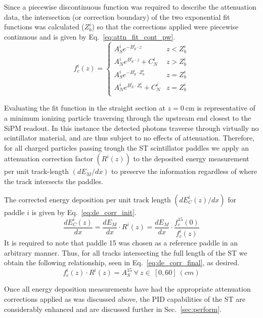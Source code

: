 Since a piecewise discontinuous function was required to describe the attenuation data, the intersection (or correction boundary) of the two exponential fit functions was calculated ($Z^{i}_{b}$) so that the corrections applied were piecewise continuous and is given by Eq.~\ref{eq:attn_fit_cont_pw}. 
	\begin{equation} \label{eq:attn_fit_cont_pw}
	f_{c}^{i}(z) = 
	\begin{cases} 
		A^{i}_{S}e^{-B^{i}_{S} \cdot z} & z < Z^{i}_{b} \\
		A^{i}_{N}e^{B^{i}_{N} \cdot z} + C^{i}_{N} & z > Z^{i}_{b} \\
		A^{i}_{S}e^{-B^{i}_{S} \cdot Z^{i}_{b}} & z = Z^{i}_{b} \\
		A^{i}_{N}e^{B^{i}_{N} \cdot Z^{i}_{b}} + C^{i}_{N} & z = Z^{i}_{b} \\
	\end{cases}
	\end{equation}

Evaluating the fit function in the straight section at $z = 0\ \mathrm{cm}$ is representative of a minimum ionizing particle traversing through the upstream end closest to the SiPM readout.  In this instance the detected photons traverse through virtually no scintillator material, and are thus subject to no effects of attenuation.  Therefore, for all charged particles passing trough the ST scintillator paddles we apply an attenuation correction factor $(R^{i}(z))$ to the deposited energy measurement per unit track-length $(dE_{M} / dx)$ to preserve the information regardless of where the track intersects the paddles.

The corrected energy deposition per unit track length $(dE^{i}_{C}(z) / dx)$ for paddle $i$ is given by Eq.~\ref{eq:de_corr_init}. 
	\begin{equation} \label{eq:de_corr_init}
	\dfrac{dE^{i}_{C} (z)}{dx} = \dfrac{dE_{M}}{dx} \cdot R^{i}(z) = \dfrac{dE_{M}}{dx} \cdot \dfrac{f^{15}_{c}(0)}{f^{i}_{c}(z)}
	\end{equation}
It is required to note that paddle 15 was chosen as a reference paddle in an arbitrary manner.  Thus, for all tracks intersecting the full length of the ST we obtain the following relationship, seen in Eq.~\ref{eq:de_corr_final}, as desired.
	\begin{equation} \label{eq:de_corr_final}
	f^{i}_{c}(z) \cdot R^{i}(z) = A^{15}_{S}\ \forall\ z \in\ [0, 60]\ (cm)
	\end{equation}

Once all energy deposition measurements have had the appropriate attenuation corrections applied as was discussed above, the PID capabilities of the ST are considerably enhanced and are discussed further in Sec.~\ref{sec:perform}.
